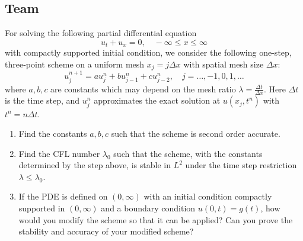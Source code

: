 \subsection{Team}

\begin{exercise}
\label{applied:2016:6}
For solving the following partial differential equation
\begin{equation}
u_t + u_x = 0, \quad -\infty \leq x \leq \infty \tag{1}
\end{equation}
with compactly supported initial condition, we consider the following one-step, three-point scheme on a uniform mesh $x_j = j\Delta x$ with spatial mesh size $\Delta x$:
\begin{equation}
u_j^{n+1} = a u_j^n + b u_{j-1}^n + c u_{j-2}^n, \quad j = \dots, -1, 0, 1, \dots \tag{2}
\end{equation}
where $a, b, c$ are constants which may depend on the mesh ratio $\lambda = \frac{\Delta t}{\Delta x}$. Here $\Delta t$ is the time step, and $u_j^n$ approximates the exact solution at $u(x_j, t^n)$ with $t^n = n\Delta t$.
\begin{enumerate}
    \item Find the constants $a, b, c$ such that the scheme is second order accurate.
    \item Find the CFL number $\lambda_0$ such that the scheme, with the constants determined by the step above, is stable in $L^2$ under the time step restriction $\lambda \leq \lambda_0$.
    \item If the PDE is defined on $(0, \infty)$ with an initial condition compactly supported in $(0, \infty)$ and a boundary condition $u(0, t) = g(t)$, how would you modify the scheme so that it can be applied? Can you prove the stability and accuracy of your modified scheme?
\end{enumerate}
\end{exercise}

